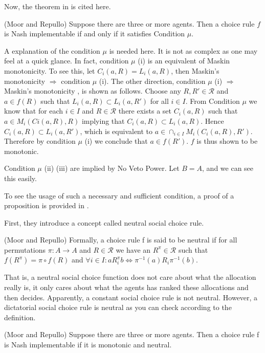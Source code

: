 Now, the theorem in \parencite{Repullo90} is cited here.

\begin{thm*}(Moor and Repullo)
\label{mu}
  Suppose there are three or more agents. Then a choice rule $f$ is Nash implementable if and only if it satisfies Condition $\mu$.
\end{thm*}

A explanation of the condition $\mu$ is needed here. It is not as complex as one may feel at a quick glance. In fact, 
condition $\mu$ (i) is an equivalent of Maskin monotonicity.  To see
this, let $C_i(a,R)= L_i(a,R)$, then Maskin's monotonicity
$\Rightarrow$ condition $\mu$ (i). The other direction,  condition
$\mu$ (i) $\Rightarrow$ Maskin's monotonicity , is shown as follows.
Choose any  $R, R' \in \mathscr{R}$ and $a \in f(R)$ such that $L_i(a, R)
\subset L_i(a, R')$ for all $i \in I$. From  Condition $\mu$ we know
that  for  each $i \in I$ and $R \in \mathscr{R}$ there  exists  a set
$C_i(a, R)$ such  that  $a \in  M_i(Ci(a,  R),  R)$  implying  that
$C_i(a, R) \subset  L_i(a,R)$.   Hence $C_i(a, R) \subset  L_i(a,R')$,
which is equivalent to $a \in \cap_{i \in I}M_i(C_i(a,R),
R')$. Therefore by condition $\mu$ (i) we conclude that $a \in
f(R')$.  $f$ is thus shown to be monotonic.

Condition $\mu$ (ii) (iii) are implied by No Veto Power. Let $B=A$, and 
we can see this easily.

To see the usage of such a necessary and sufficient condition, a proof
of a proposition is provided in \parencite{Repullo90}.

First, they introduce a concept called neutral social choice rule.
\begin{definition*}(Moor and Repullo)   
Formally,  a choice rule  f  is  said  to  be neutral  if  for  all  permutations  $\pi:  A \rightarrow A$  and  $R \in \mathscr{R}$
  we have an $R^\pi \in \mathscr{R}$ such that $f(R^\pi) = \pi \circ f(R) $  and  $\forall i \in I: a R^\pi_i b \Longleftrightarrow \pi^{-1}(a) R_i \pi^{-1}(b)$.  
  \end{definition*}

That is, a neutral social choice function does not care about what the
allocation really is, it only cares about what the agents has ranked
these allocations and then decides. Apparently, a constant social
choice rule  is not neutral. However, a dictatorial social choice
rule is neutral as you can check according to the definition.


\begin{prop*}(Moor and Repullo)
  Suppose there are three or more agents. Then a choice rule f is
Nash implementable if it is monotonic and neutral.
  
\end{prop*}

